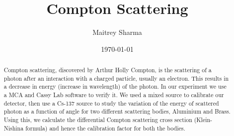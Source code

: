\documentclass[%
 reprint,
nofootinbib,
 amsmath,amssymb,
 aps,
floatfix,
]{revtex4-2}
\begin{document}

\title{Compton Scattering}%


\author{Maitrey Sharma}




\date{\today}%

\begin{abstract}
    Compton scattering, discovered by Arthur Holly Compton, is the scattering of a photon after an interaction with a charged particle, usually an electron. This results in a decrease in energy (increase in wavelength) of the photon. In our experiment we use a MCA and Cassy Lab software to verify it. We used a mixed source to calibrate our detector, then use a Cs-137 source to study the variation of the energy of scattered photon as a function of angle for two different scattering bodies, Aluminium and Brass. Using this, we calculate the differential Compton scattering cross section (Klein-Nishina formula) and hence the calibration factor for both the bodies.
\end{abstract}

\keywords{}
\maketitle

\end{document}
